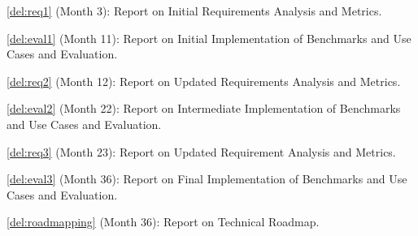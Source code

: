 \begin{Workpackage}{\thewpno}
\begin{Task}
\end{Task}

\vspace{-10pt}
\begin{WPDeliverables}
\begin{compactitem}
\item \ref{del:req1} (Month 3): Report on Initial Requirements Analysis and Metrics.
\item \ref{del:eval1} (Month 11): Report on Initial Implementation of Benchmarks and Use Cases and Evaluation.
\item \ref{del:req2} (Month 12): Report on Updated Requirements Analysis and Metrics.
\item \ref{del:eval2} (Month 22): Report on Intermediate Implementation of Benchmarks and Use Cases and Evaluation.
\item \ref{del:req3} (Month 23): Report on Updated Requirement Analysis and Metrics.
\item \ref{del:eval3} (Month 36): Report on Final Implementation of Benchmarks and Use Cases and Evaluation.
\item \ref{del:roadmapping} (Month 36): Report on Technical Roadmap.
\end{compactitem}
\end{WPDeliverables}

\end{Workpackage}
